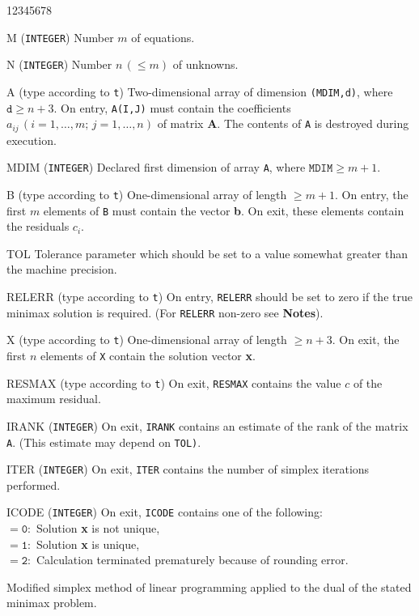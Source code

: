 \begin{DLtt}{12345678}
\item[M] ({\tt INTEGER}) Number $m$ of equations.
\item[N] ({\tt INTEGER}) Number $n\,(\le m)$ of unknowns.
\item[A] (type according to {\tt t})
Two-dimensional array of dimension {\tt (MDIM,d)},
where $\mathtt{d} \ge n+3$. On entry, {\tt A(I,J)} must contain the
coefficients $a_{ij}\,(i=1,\ldots,m;\,j=1,\ldots,n)$ of matrix {\bf A}.
The contents of {\tt A} is destroyed during execution.
\item[MDIM] ({\tt INTEGER}) Declared first dimension of array {\tt A},
where $\mathtt{MDIM} \ge m+1$.
\item[B] (type according to {\tt t})
One-dimensional array of length $\ge m+1$.
On entry, the first $m$ elements of {\tt B} must contain the vector
{\bf b}. On exit, these elements contain the residuals $c_i$.
\item[TOL] Tolerance parameter which should be set to a
value somewhat greater than the machine precision.
\item[RELERR] (type according to {\tt t}) On entry, {\tt RELERR}
should be set to zero if the true minimax solution is required.
(For {\tt RELERR} non-zero see {\bf Notes}).
\item[X] (type according to {\tt t}) One-dimensional array of length
$\ge n+3$. On exit, the first $n$ elements of {\tt X} contain the
solution vector {\bf x}.
\item [RESMAX] (type according to {\tt t}) On exit, {\tt RESMAX}
contains the value $c$ of the maximum residual.
\item [IRANK]({\tt INTEGER}) On exit, {\tt IRANK} contains an estimate of
the rank of the matrix {\tt A}. (This estimate may depend on {\tt TOL)}.
\item [ITER]({\tt INTEGER}) On exit, {\tt ITER} contains the number of
simplex iterations performed.
\item [ICODE]({\tt INTEGER}) On exit, {\tt ICODE} contains one of the
following: \\
$\mathtt{= 0:}$ Solution {\bf x} is not unique, \\
$\mathtt{= 1:}$ Solution {\bf x} is unique,\\
$\mathtt{= 2:}$ Calculation terminated prematurely because of rounding
error.
\end{DLtt}
\newpage
\Method
Modified simplex method of linear programming applied to the dual of
the stated minimax problem.
\Notes
